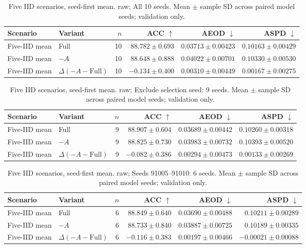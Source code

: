 \begin{table}[t]
\centering
\small
\caption{Five IID scenarios, seed-first mean. raw; All 10 seeds. Mean $\pm$ sample SD across paired model seeds; validation only.}
\begin{tabular}{llrrrr}
\toprule
Scenario & Variant & $n$ & ACC $\uparrow$ & AEOD $\downarrow$ & ASPD $\downarrow$ \\
\midrule
Five-IID mean & Full & 10 & $88.782 \pm 0.693$ & $0.03713 \pm 0.00423$ & $0.10163 \pm 0.00429$ \\
Five-IID mean & $-A$ & 10 & $88.648 \pm 0.888$ & $0.04022 \pm 0.00701$ & $0.10330 \pm 0.00530$ \\
Five-IID mean & $\Delta(-A-\mathrm{Full})$ & 10 & $-0.134 \pm 0.400$ & $0.00310 \pm 0.00449$ & $0.00167 \pm 0.00275$ \\
\bottomrule
\end{tabular}
\end{table}

\begin{table}[t]
\centering
\small
\caption{Five IID scenarios, seed-first mean. raw; Exclude selection seed: 9 seeds. Mean $\pm$ sample SD across paired model seeds; validation only.}
\begin{tabular}{llrrrr}
\toprule
Scenario & Variant & $n$ & ACC $\uparrow$ & AEOD $\downarrow$ & ASPD $\downarrow$ \\
\midrule
Five-IID mean & Full & 9 & $88.907 \pm 0.604$ & $0.03689 \pm 0.00442$ & $0.10260 \pm 0.00318$ \\
Five-IID mean & $-A$ & 9 & $88.825 \pm 0.730$ & $0.03983 \pm 0.00732$ & $0.10393 \pm 0.00520$ \\
Five-IID mean & $\Delta(-A-\mathrm{Full})$ & 9 & $-0.082 \pm 0.386$ & $0.00294 \pm 0.00473$ & $0.00133 \pm 0.00269$ \\
\bottomrule
\end{tabular}
\end{table}

\begin{table}[t]
\centering
\small
\caption{Five IID scenarios, seed-first mean. raw; Seeds 91005–91010: 6 seeds. Mean $\pm$ sample SD across paired model seeds; validation only.}
\begin{tabular}{llrrrr}
\toprule
Scenario & Variant & $n$ & ACC $\uparrow$ & AEOD $\downarrow$ & ASPD $\downarrow$ \\
\midrule
Five-IID mean & Full & 6 & $88.849 \pm 0.640$ & $0.03690 \pm 0.00488$ & $0.10211 \pm 0.00289$ \\
Five-IID mean & $-A$ & 6 & $88.733 \pm 0.840$ & $0.03887 \pm 0.00725$ & $0.10189 \pm 0.00335$ \\
Five-IID mean & $\Delta(-A-\mathrm{Full})$ & 6 & $-0.116 \pm 0.383$ & $0.00197 \pm 0.00466$ & $-0.00021 \pm 0.00088$ \\
\bottomrule
\end{tabular}
\end{table}

